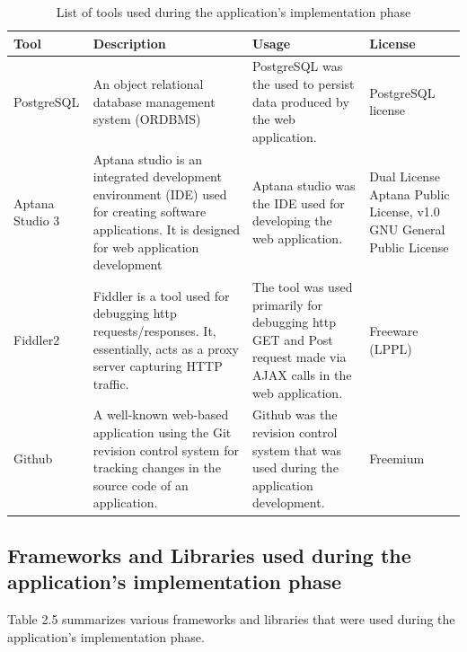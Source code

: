 \begin{table}
  \centering
  \begin{tabular}{|p{100px}|p{100px}|p{100px}|p{100px}|}
    \hline
    Tool  & Description & Usage & License \\
    \hline
    PostgreSQL & An object relational database management system (ORDBMS) & PostgreSQL was the used to persist data produced by the web application. & PostgreSQL license \\ \hline

    Aptana Studio 3 & Aptana studio is an integrated development environment (IDE) used for creating software applications. It is designed for web application development & Aptana studio was the IDE used for developing the web application. & Dual License Aptana Public License, v1.0 GNU General Public License \\ \hline

    Fiddler2 & Fiddler is a tool used for debugging http requests/responses. It, essentially, acts as a proxy server capturing HTTP traffic. & The tool was used primarily for debugging http GET and Post request made via AJAX calls in the web application.  & Freeware (LPPL) \\ \hline

    Github & A well-known web-based application using the Git revision control system for tracking changes in the source code of an application.  & Github was the revision control system that was used during the application development. & Freemium \\
    \hline
  \end{tabular}
  \caption{List of tools used during the application's implementation phase}\label{implementaioTools}
\end{table}

\subsection{Frameworks and Libraries used during the application's implementation phase}

Table 2.5 summarizes various frameworks and libraries that were used during the application's implementation phase.


